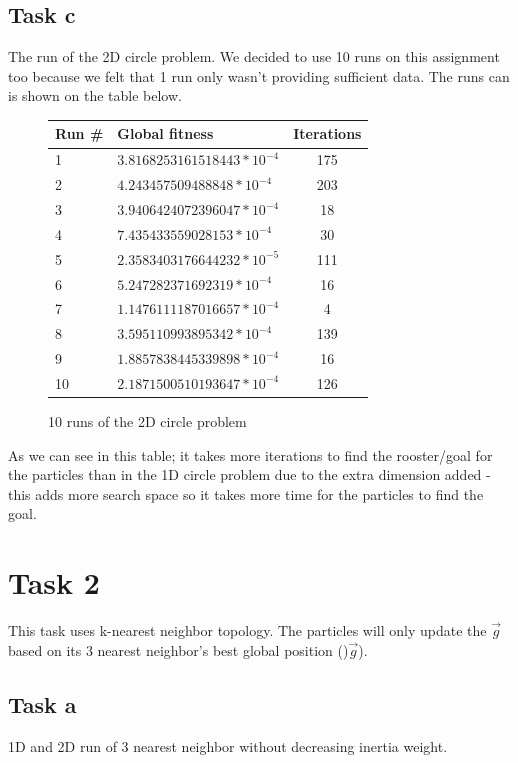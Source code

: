 \documentclass[12pt, a4paper]{article}
\begin{document}
\subsection{Task c}
The run of the 2D circle problem. We decided to use 10 runs on this assignment too because we felt that 1 run only wasn't providing sufficient data. The runs can is shown on the table below.
\begin{figure}[H]
\begin{center}
\begin{tabular}{l| l  c}
Run \# & Global fitness& Iterations\\ \hline
1&$3.8168253161518443*10^{-4}$ & 175\\ 
2&$4.243457509488848*10^{-4}$ & 203\\
3&$3.9406424072396047*10^{-4}$ & 18\\ 
4&$7.435433559028153*10^{-4}$ & 30\\
5&$2.3583403176644232*10^{-5}$ & 111\\ 
6&$5.247282371692319*10^{-4}$ & 16\\ 
7&$1.1476111187016657*10^{-4}$ & 4\\ 
8&$3.595110993895342*10^{-4}$ & 139\\
9&$1.8857838445339898*10^{-4}$ & 16\\ 
10&$2.1871500510193647*10^{-4}$ & 126\\ 
\end{tabular}
\caption{10 runs of the 2D circle problem}
\end{center}
\end{figure}
As we can see in this table; it takes more iterations to find the rooster/goal for the particles than in the 1D circle problem due to the extra dimension added - this adds more search space so it takes more time for the particles to find the goal.

\section{Task 2}
This task uses k-nearest neighbor topology. The particles will only update the $\vec{g}$ based on its 3 nearest neighbor's best global position ()$\vec{g}$). 
\subsection{Task a}
1D and 2D run of 3 nearest neighbor without decreasing inertia weight.
\end{document}
